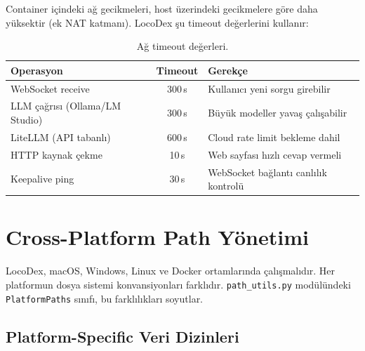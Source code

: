 Container i\c{c}indeki a\u{g} gecikmeleri, host \"{u}zerindeki gecikmelere g\"{o}re daha y\"{u}ksektir (ek NAT katman{\i}). LocoDex \c{s}u timeout de\u{g}erlerini kullan{\i}r:

\begin{table}[H]
\centering
\caption{A\u{g} timeout de\u{g}erleri.}
\label{tab:timeout-values}
\begin{tabular}{lcl}
\toprule
\textbf{Operasyon} & \textbf{Timeout} & \textbf{Gerek\c{c}e} \\
\midrule
WebSocket receive & 300\,s & Kullan{\i}c{\i} yeni sorgu girebilir \\
LLM \c{c}a\u{g}r{\i}s{\i} (Ollama/LM Studio) & 300\,s & B\"{u}y\"{u}k modeller yava\c{s} \c{c}al{\i}\c{s}abilir \\
LiteLLM (API tabanl{\i}) & 600\,s & Cloud rate limit bekleme dahil \\
HTTP kaynak \c{c}ekme & 10\,s & Web sayfas{\i} h{\i}zl{\i} cevap vermeli \\
Keepalive ping & 30\,s & WebSocket ba\u{g}lant{\i} canl{\i}l{\i}k kontrol\"{u} \\
\bottomrule
\end{tabular}
\end{table}

\section{Cross-Platform Path Y\"{o}netimi}
\label{sec:cross-platform-paths}

LocoDex, macOS, Windows, Linux ve Docker ortamlar{\i}nda \c{c}al{\i}\c{s}mal{\i}d{\i}r. Her platformun dosya sistemi konvansiyonlar{\i} farkl{\i}d{\i}r. \texttt{path\_utils.py} mod\"{u}l\"{u}ndeki \texttt{PlatformPaths} s{\i}n{\i}f{\i}, bu farkl{\i}l{\i}klar{\i} soyutlar.

\subsection{Platform-Specific Veri Dizinleri}


